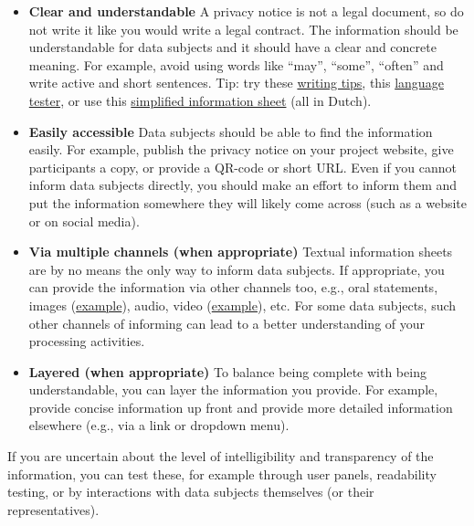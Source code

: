 \documentclass[
]{book}
\begin{document}
\begin{itemize}
\item
  \textbf{Clear and understandable}
  A privacy notice is not a legal document, so do not write it like you would
  write a legal contract. The information should be understandable for data
  subjects and it should have a clear and concrete meaning. For example, avoid
  using words like ``may'', ``some'', ``often'' and write active and short sentences.
  Tip: try these
  \href{https://www.researchplatform-dorp.nl/wp-content/uploads/20220329-Handleiding-PIF-beperkte_gezondheidsvaardigheden.pdf}{writing tips},
  this \href{https://ishetb1.nl/}{language tester}, or use this
  \href{https://www.pharos.nl/kennisbank/eenvoudige-en-begrijpelijke-onderzoeksformulieren-patientinformatieformulier-pif/}{simplified information sheet}
  (all in Dutch).
\item
  \textbf{Easily accessible}
  Data subjects should be able to find the information easily. For example, publish
  the privacy notice on your project website, give participants a copy, or provide
  a QR-code or short URL. Even if you cannot inform data subjects directly, you
  should make an effort to inform them and put the information somewhere they will
  likely come across (such as a website or on social media).
\item
  \textbf{Via multiple channels (when appropriate)}
  Textual information sheets are by no means the only way to inform data subjects.
  If appropriate, you can provide the information via other channels too, e.g.,
  oral statements, images
  (\href{https://irenececile.com/project/stripverhaal-wetenschappelijk-medicijnonderzoek-voor-kinderen-informed-consent/}{example}),
  audio, video
  (\href{https://www.youtube.com/watch?v=H5aMCfqw1Lw}{example}),
  etc. For some data subjects, such other channels of informing can lead to a better
  understanding of your processing activities.
\item
  \textbf{Layered (when appropriate)}
  To balance being complete with being understandable, you can layer the
  information you provide. For example, provide concise information up front and
  provide more detailed information elsewhere (e.g., via a link or dropdown menu).
\end{itemize}

If you are uncertain about the level of intelligibility and transparency of the
information, you can test these, for example through user panels, readability
testing, or by interactions with data subjects themselves (or their
representatives).
\end{document}
